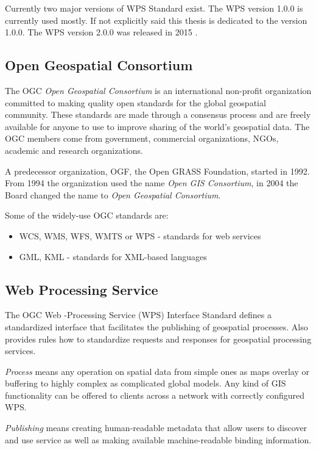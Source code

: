\documentclass[12pt,a4paper]{article}
\begin{document}
Currently two major versions of WPS Standard exist. The WPS version 1.0.0 is currently used mostly.
If not explicitly said this thesis is dedicated to the version 1.0.0. The WPS version 2.0.0 was
released in 2015 \cite{WPS_second}.

\subsection{Open Geospatial Consortium}
The OGC \textit{Open Geospatial Consortium} is an international non-profit organization committed to making quality 
open standards for the global geospatial community. These standards are made through a consensus process and are freely available for anyone to use to improve sharing of the world's geospatial data. The OGC members come from government, commercial organizations, NGOs, academic and research organizations.\cite{OGC}

A predecessor organization, OGF, the Open GRASS Foundation, started in 1992. From 1994 the organization 
used the name \textit{Open GIS Consortium}, in 2004 the Board changed the name to \textit{Open Geospatial Consortium}.\cite{OGC_history}

Some of the widely-use OGC standards are:
\begin{itemize}
\item WCS, WMS, WFS, WMTS or WPS - standards for web services
\item GML, KML - standards for XML-based languages
\end{itemize}


\bigskip
\subsection{Web Processing Service}
The OGC Web -Processing Service (WPS) Interface Standard defines a standardized interface
that facilitates the publishing of geospatial processes. Also provides rules how to standardize
requests and responses for geospatial processing services. 

\textit{Process} means any operation on spatial
data from simple ones as maps overlay or buffering to highly complex as complicated global models. Any kind of GIS 
functionality can be offered to clients across a network with correctly configured WPS. 

\textit{Publishing} means
creating human-readable metadata that allow users to discover and use service as well as making 
available machine-readable binding information.
\end{document}
